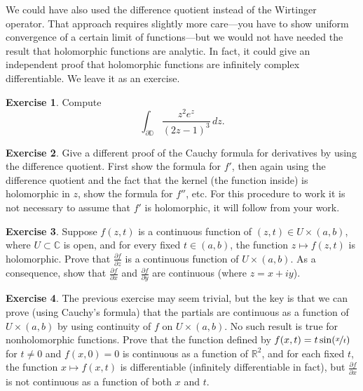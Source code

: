 \documentclass[12pt,openany]{book}
\newcommand{\C}{{\mathbb{C}}}
\newcommand{\R}{{\mathbb{R}}}
\newcommand{\D}{{\mathbb{D}}}
\theoremstyle{plain}
\theoremstyle{remark}
\theoremstyle{definition}
\newenvironment{exbox}{%
    \def\FrameCommand{\vrule width 1pt \relax\hspace{10pt}}%
    \MakeFramed{\advance\hsize-\width\FrameRestore}%
}{%
    \endMakeFramed
}
\theoremstyle{exercise}
\newtheorem{exercise}{Exercise}[section]
\theoremstyle{example}
\begin{document}
We could have also used the difference quotient instead of the
Wirtinger operator.  That approach requires slightly more care---you have to show
uniform convergence of a certain limit of functions---but we
would not have needed the result
that holomorphic functions are analytic.  In fact,
it could give an independent proof that holomorphic functions are infinitely
complex differentiable.
We leave it as an exercise.

\begin{exbox}
\begin{exercise}
Compute
\begin{equation*}
\int_{\partial \D}
\frac{z^2 e^z}{(2z-1)^3} \, dz .
\end{equation*}
\end{exercise}

\begin{exercise}
Give a different proof of the Cauchy formula for derivatives by using the difference
quotient.  First show the formula for $f'$, then again using the difference
quotient and the fact that the kernel (the function inside) is holomorphic
in $z$, show the formula for $f''$, etc.  For this procedure to work it is
not necessary to assume that $f'$ is holomorphic, it will follow from your
work.
\end{exercise}

\begin{exercise}%
\label{exercise:partialderscont}
Suppose $f(z,t)$ is a continuous function of $(z,t) \in U \times (a,b)$,
where $U \subset \C$ is open, and for every fixed $t \in (a,b)$, the function
$z \mapsto f(z,t)$ is holomorphic.  Prove that
$\frac{\partial f}{\partial z}$ is a continuous function of $U \times
(a,b)$.  As a consequence, show that
$\frac{\partial f}{\partial x}$
and
$\frac{\partial f}{\partial y}$ are continuous (where $z=x+iy$).
\end{exercise}

\begin{exercise}
The previous exercise may seem trivial, but the key is that we can prove
(using Cauchy's formula) that the partials are continuous as a function of
$U \times (a,b)$ by using continuity of $f$ on $U \times (a,b)$.  No such
result is true for nonholomorphic functions.  Prove that the function defined by
$f(x,t) = t \sin(\nicefrac{x}{t})$ for $t \not= 0$ and $f(x,0) =  0$
is continuous as a function of $\R^2$, and for each fixed $t$, the function
$x \mapsto f(x,t)$ is differentiable (infinitely differentiable in fact),
but $\frac{\partial f}{\partial x}$ is not continuous as a function of both
$x$ and $t$.
\end{exercise}
\end{exbox}
\end{document}
